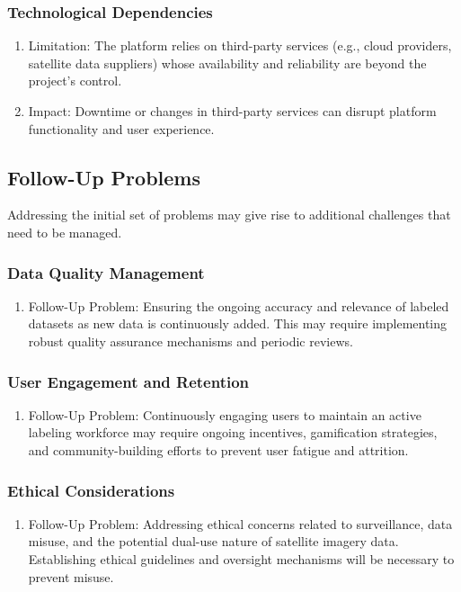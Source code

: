 \documentclass[12pt]{article}
\begin{document}
\subsubsection{Technological Dependencies}
\begin{enumerate}
    \item Limitation: The platform relies on third-party services (e.g., cloud providers, satellite data suppliers) whose availability and reliability are beyond the project's control.
    \item Impact: Downtime or changes in third-party services can disrupt platform functionality and user experience.
\end{enumerate}
\subsection{Follow-Up Problems}
Addressing the initial set of problems may give rise to additional challenges that need to be managed.
\subsubsection{Data Quality Management}
\begin{enumerate}
    \item Follow-Up Problem: Ensuring the ongoing accuracy and relevance of labeled datasets as new data is continuously added. This may require implementing robust quality assurance mechanisms and periodic reviews.
\end{enumerate}
\subsubsection{User Engagement and Retention}
\begin{enumerate}
    \item Follow-Up Problem: Continuously engaging users to maintain an active labeling workforce may require ongoing incentives, gamification strategies, and community-building efforts to prevent user fatigue and attrition.
\end{enumerate}
\subsubsection{Ethical Considerations}
\begin{enumerate}
    \item Follow-Up Problem: Addressing ethical concerns related to surveillance, data misuse, and the potential dual-use nature of satellite imagery data. Establishing ethical guidelines and oversight mechanisms will be necessary to prevent misuse.
\end{enumerate}
\end{document}
